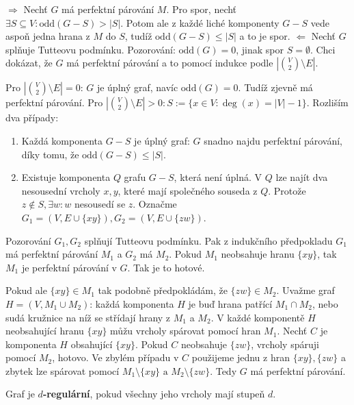 \begin{dukaz}
	$\Rightarrow$ Nechť $G$ má perfektní párování $M$. Pro spor, nechť $\exists S \subseteq V: \text{odd}(G-S) >|S|$. Potom ale z každé liché komponenty $G-S$ vede aspoň jedna hrana z $M$ do $S$, tudíž $\text{odd}(G-S) \leq |S|$ a to je spor. $\Leftarrow$ Nechť $G$ splňuje Tutteovu podmínku. Pozorování: $\text{odd}(G) = 0$, jinak spor $S = \emptyset$. Chci dokázat, že $G$ má perfektní párování a to pomocí indukce podle $|\binom{V}{2} \setminus E|$.
	
	Pro $|\binom{V}{2} \setminus E| = 0$: $G$ je úplný graf, navíc $\text{odd}(G) = 0$. Tudíž zjevně má perfektní párování. Pro $|\binom{V}{2} \setminus E| > 0: S:= \{x \in V: \deg (x) = |V|-1\}$. Rozliším dva případy:
	
	\begin{enumerate}
		\item Každá komponenta $G-S$ je úplný graf: $G$ snadno najdu perfektní párování, díky tomu, že $\text{odd}(G-S) \leq |S|$.
		\item Existuje komponenta $Q$ grafu $G-S$, která není úplná. V $Q$ lze najít dva nesousední vrcholy $x,y$, které mají společného souseda z $Q$. Protože $z \notin S, \exists w: w$ nesousedí se $z$. Označme $G_{1} = (V, E \cup \{xy\}), G_{2} = (V, E \cup \{zw\})$.
	\end{enumerate}
	
	Pozorování $G_{1}, G_{2}$ splňují Tutteovu podmínku. Pak z indukčního předpokladu $G_{1}$ má perfektní párování $M_{1}$ a $G_{2}$ má $M_{2}$. Pokud $M_{1}$ neobsahuje hranu $\{xy\}$, tak $M_{1}$ je perfektní párování v $G$. Tak je to hotové.
	
	Pokud ale $\{xy\} \in M_{1}$ tak podobně předpokládám, že $\{zw\} \in M_{2}$. Uvažme graf $H = (V, M_{1} \cup M_{2})$: každá komponenta $H$ je buď hrana patřící $M_{1} \cap M_{2}$, nebo sudá kružnice na níž se střídají hrany z $M_{1}$ a $M_{2}$. V každé komponentě $H$ neobsahující hranu $\{xy\}$ můžu vrcholy spárovat pomocí hran $M_{1}$. Nechť $C$ je komponenta $H$ obsahující $\{xy\}$. Pokud $C$ neobsahuje $\{zw\}$, vrcholy spáruji pomocí $M_{2}$, hotovo. Ve zbylém případu v $C$ použijeme jednu z hran $\{xy\}, \{zw\}$ a zbytek lze spárovat pomocí $M_{1} \setminus \{xy\} \text{ a } M_{2} \setminus \{zw\}$. Tedy $G$ má perfektní párování.
\end{dukaz}

\begin{definice}
	Graf je \textbf{$d$-regulární}, pokud všechny jeho vrcholy mají stupeň $d$.
\end{definice}

